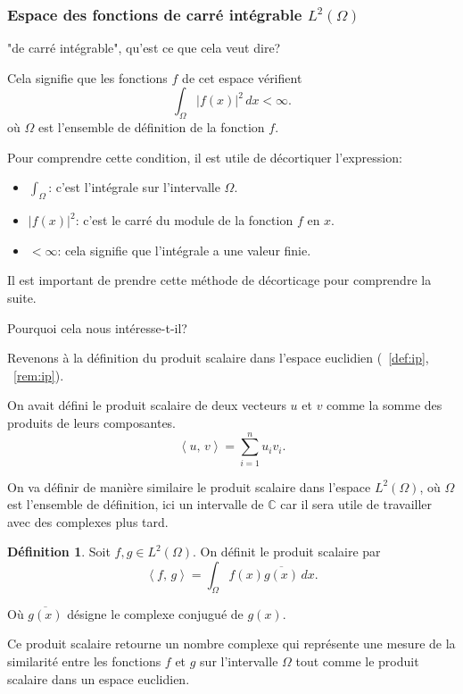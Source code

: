 \documentclass[11pt,a4paper]{article}
\numberwithin{equation}{section}
\theoremstyle{plain}
\theoremstyle{definition}
\newtheorem{definition}[theorem]{Définition}
\theoremstyle{remark}
\newcommand{\C}{\mathbb{C}}
\newcommand{\ip}[2]{\left\langle #1,\, #2\right\rangle}
\begin{document}
\subsubsection{Espace des fonctions de carré intégrable $L^2(\Omega)$}

"de carré intégrable", qu'est ce que cela veut dire?

Cela signifie que les fonctions $f$ de cet espace vérifient
\[
    \int_\Omega |f(x)|^2 \, dx < \infty.
\]
où $\Omega$ est l'ensemble de définition de la fonction $f$.
\begin{indication}
    Pour comprendre cette condition, il est utile de décortiquer l'expression:
    \begin{itemize}
        \item $\int_{\Omega}$: c'est l'intégrale sur l'intervalle $\Omega$. 
        \item $|f(x)|^2$: c'est le carré du module de la fonction $f$ en $x$. 
        \item $< \infty$: cela signifie que l'intégrale a une valeur finie.
    \end{itemize}
    Il est important de prendre cette méthode de décorticage pour comprendre la suite.
\end{indication}

Pourquoi cela nous intéresse-t-il?

Revenons à la définition du produit scalaire dans l'espace euclidien (~\ref{def:ip}, ~\ref{rem:ip}).

On avait défini le produit scalaire de deux vecteurs $u$ et $v$ comme la somme des produits de leurs composantes.
\[
    \ip{u}{v} = \sum_{i=1}^n u_i v_i.
\]

On va définir de manière similaire le produit scalaire dans l'espace $L^2(\Omega)$, où $\Omega$ est l'ensemble de définition, ici un intervalle de $\C$ car il sera utile de travailler avec des complexes plus tard.

\begin{definition} \label{def:ip_L2}
    Soit $f,g \in L^2(\Omega)$. On définit le produit scalaire par
    \[
        \ip{f}{g} = \int_\Omega f(x) \overline{g(x)} \, dx.
    \]
\end{definition}

Où $\overline{g(x)}$ désigne le complexe conjugué de $g(x)$.

Ce produit scalaire retourne un nombre complexe qui représente une mesure de la similarité entre les fonctions $f$ et $g$ sur l'intervalle $\Omega$ tout comme le produit scalaire dans un espace euclidien.
\end{document}
